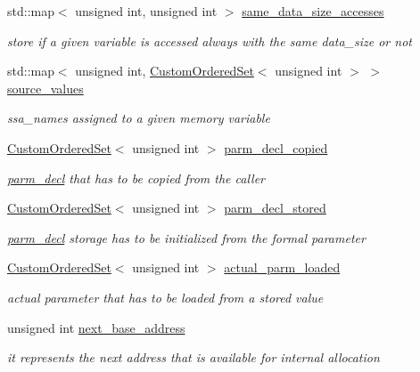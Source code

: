 \begin{DoxyCompactItemize}
std\+::map$<$ unsigned int, unsigned int $>$ \hyperlink{classmemory_a8bce4956a8b768487cced20ae90120fc}{same\+\_\+data\+\_\+size\+\_\+accesses}
\begin{DoxyCompactList}\small\item\em store if a given variable is accessed always with the same data\+\_\+size or not \end{DoxyCompactList}\item 
std\+::map$<$ unsigned int, \hyperlink{classCustomOrderedSet}{Custom\+Ordered\+Set}$<$ unsigned int $>$ $>$ \hyperlink{classmemory_af2c50f29b1e11b8a03c8e58491fc3fb9}{source\+\_\+values}
\begin{DoxyCompactList}\small\item\em ssa\+\_\+names assigned to a given memory variable \end{DoxyCompactList}\item 
\hyperlink{classCustomOrderedSet}{Custom\+Ordered\+Set}$<$ unsigned int $>$ \hyperlink{classmemory_a7f54cdccc221acb58e2c87898f4e7005}{parm\+\_\+decl\+\_\+copied}
\begin{DoxyCompactList}\small\item\em \hyperlink{structparm__decl}{parm\+\_\+decl} that has to be copied from the caller \end{DoxyCompactList}\item 
\hyperlink{classCustomOrderedSet}{Custom\+Ordered\+Set}$<$ unsigned int $>$ \hyperlink{classmemory_a9dc8f2a404f5d05c44e43d5b0d05d3e8}{parm\+\_\+decl\+\_\+stored}
\begin{DoxyCompactList}\small\item\em \hyperlink{structparm__decl}{parm\+\_\+decl} storage has to be initialized from the formal parameter \end{DoxyCompactList}\item 
\hyperlink{classCustomOrderedSet}{Custom\+Ordered\+Set}$<$ unsigned int $>$ \hyperlink{classmemory_ade20269d0dbb7efbf708fd694bb82d82}{actual\+\_\+parm\+\_\+loaded}
\begin{DoxyCompactList}\small\item\em actual parameter that has to be loaded from a stored value \end{DoxyCompactList}\item 
unsigned int \hyperlink{classmemory_a74f7fc9e278fc5f1047c06887bfbf628}{next\+\_\+base\+\_\+address}
\begin{DoxyCompactList}\small\item\em it represents the next address that is available for internal allocation \end{DoxyCompactList}\item 

\end{DoxyCompactItemize}
